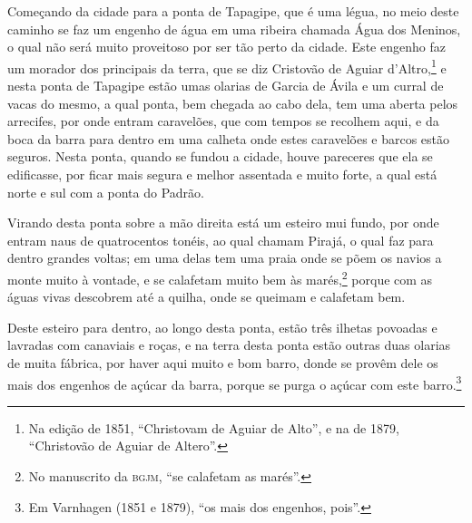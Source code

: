 Começando da cidade para a ponta de Tapagipe, que é uma légua, no meio deste caminho se
faz um engenho de água em uma ribeira chamada Água dos Meninos, o qual não será muito
proveitoso por ser tão perto da cidade. Este engenho faz um morador dos principais da
terra, que se diz Cristovão de Aguiar d'Altro,\footnote{ Na edição de 1851, ``Christovam
de Aguiar de Alto'', e na de 1879, ``Christovão de Aguiar de Altero''.} e nesta ponta de
Tapagipe estão umas olarias de Garcia de Ávila e um curral de vacas do mesmo, a qual
ponta, bem chegada ao cabo dela, tem uma aberta pelos arrecifes, por onde entram
caravelões, que com tempos se recolhem aqui, e da boca da barra para dentro em uma calheta
onde estes caravelões e barcos estão seguros. Nesta ponta, quando se fundou a cidade,
houve pareceres que ela se edificasse, por ficar mais segura e melhor assentada e muito
forte, a qual está norte e sul com a ponta do Padrão.

Virando desta ponta sobre a mão direita está um esteiro mui fundo, por onde entram naus de
quatrocentos tonéis, ao qual chamam Pirajá, o qual faz para dentro grandes voltas; em uma
delas tem uma praia onde se põem os navios a monte muito à vontade, e se calafetam muito
bem às marés,\footnote{ No manuscrito da \textsc{bgjm}, ``se calafetam as marés''.} porque
com as águas vivas descobrem até a quilha, onde se queimam e calafetam bem.

Deste esteiro para dentro, ao longo desta ponta, estão três ilhetas povoadas e lavradas
com canaviais e roças, e na terra desta ponta estão outras duas olarias de muita fábrica,
por haver aqui muito e bom barro, donde se provêm dele os mais dos engenhos de açúcar da
barra, porque se purga o açúcar com este barro.\footnote{ Em Varnhagen (1851 e 1879), ``os
mais dos engenhos, pois''.}

